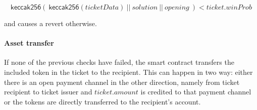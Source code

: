 $$ \mathsf{keccak256} ( \ \mathsf{keccak256}(ticketData) \ || \ solution \ || \ opening \ ) < ticket.winProb $$

and causes a revert otherwise.

\paragraph{Asset transfer}
\label{sec:tickets:redemption:assettransfer}

If none of the previous checks have failed, the smart contract transfers the included token in the ticket to the recipient. This can happen in two way: either there is an open payment channel in the other direction, namely from ticket recipient to ticket issuer and $ticket.amount$ is credited to that payment channel or the tokens are directly transferred to the recipient's account.
